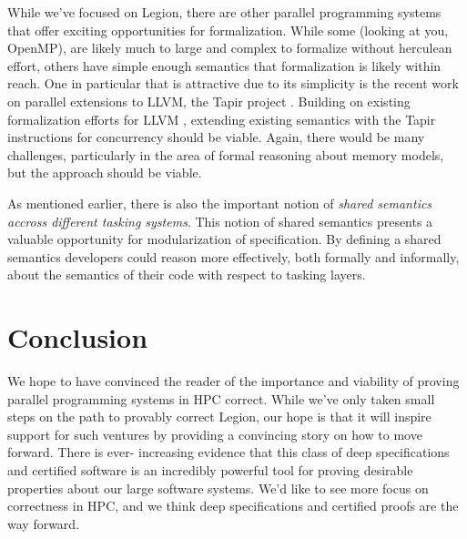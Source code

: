 \documentclass[sigconf]{acmart}
\begin{document}
While we've focused on Legion, there are other parallel programming systems
that offer exciting opportunities for formalization. While some (looking at
you, OpenMP), are likely much to large and complex to formalize without
herculean effort, others have simple enough semantics that formalization is
likely within reach. One in particular that is attractive due to its simplicity
is the recent work on parallel extensions to LLVM, the Tapir project
\cite{schardl2017tapir}. Building on existing formalization efforts for LLVM
\cite{zhao2012formalizing}, extending existing semantics with the Tapir instructions for
concurrency should be viable. Again, there would be many challenges,
particularly in the area of formal reasoning about memory models, but the
approach should be viable.

As mentioned earlier, there is also the important notion of \emph{shared
semantics accross different tasking systems}. This notion of shared semantics
presents a valuable opportunity for modularization of specification. By defining
a shared semantics developers could reason more effectively, both formally and
informally, about the semantics of their code with respect to tasking layers.

\section{Conclusion}

We hope to have convinced the reader of the importance and viability of proving
parallel programming systems in HPC correct. While we've only taken small steps
on the path to provably correct Legion, our hope is that it will inspire
support for such ventures by providing a convincing story on how to move
forward. There is ever- increasing evidence that this class of deep
specifications and certified software is an incredibly powerful tool for
proving desirable properties about our large software systems. We'd like to see
more focus on correctness in HPC, and we think deep specifications and
certified proofs are the way forward.




\end{document}
